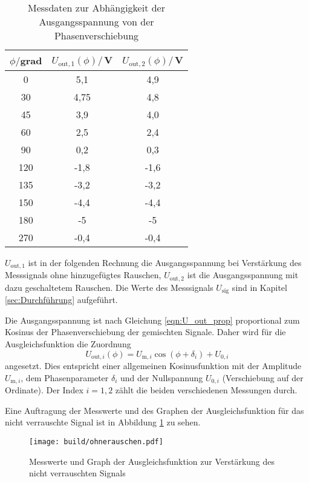 \begin{table}
\centering
\caption{Messdaten zur Abhängigkeit der Ausgangsspannung von der Phasenverschiebung}
\label{tab:phase}
\begin{tabular}{c c c}
\toprule
$\phi/$grad & $U_\mathrm{out,1}(\phi)/$\,V & $U_\mathrm{out,2}(\phi)/$\,V \\
\midrule
  0	& 5,1	 & 4,9  \\
 30	&	4,75 & 4,8  \\
 45	&	3,9	 & 4,0  \\
 60	&	2,5	 & 2,4  \\
 90	&	0,2	 & 0,3  \\
120 &	-1,8 & -1,6 \\
135 &	-3,2 & -3,2 \\
150 &	-4,4 & -4,4 \\
180 &	-5   & -5   \\
270 &	-0,4 & -0,4 \\
\bottomrule
\end{tabular}
\end{table}

$U_\mathrm{out,1}$ ist in der folgenden Rechnung
die Ausgangsspannung bei Verstärkung des Messsignals
ohne hinzugefügtes Rauschen, $U_\mathrm{out,2}$ ist die Ausgangsspannung mit dazu geschaltetem
Rauschen. Die Werte des Messsignals $U_\mathrm{sig}$ sind in Kapitel \ref{sec:Durchführung}
aufgeführt.

Die Ausgangsspannung ist nach Gleichung \eqref{eqn:U_out_prop} proportional zum Kosinus der
Phasenverschiebung der gemischten Signale. Daher wird für die Ausgleichsfunktion
die Zuordnung
\begin{equation}
  U_{\mathrm{out,}i}(\phi) = U_{\mathrm{m,}i} \cos(\phi+\delta_i)+ U_{0,i}
  \label{eqn:fit}
\end{equation}
angesetzt. Dies entspricht einer allgemeinen Kosinusfunktion mit der Amplitude
$U_{\mathrm{m},i}$, dem Phasenparameter $\delta_i$ und der Nullspannung $U_{0,i}$ (Verschiebung
auf der Ordinate). Der Index $i=1,2$ zählt die beiden verschiedenen Messungen durch.

Eine Auftragung der Messwerte und des Graphen der Ausgleichsfunktion für das nicht
verrauschte Signal ist in Abbildung \ref{fig:nichtrausch} zu sehen.

\begin{figure}
  \centering
  \texttt{[image: build/ohnerauschen.pdf]}
  \caption{Messwerte und Graph der Ausgleichsfunktion zur Verstärkung des nicht verrauschten Signals}
  \label{fig:nichtrausch}
\end{figure}

